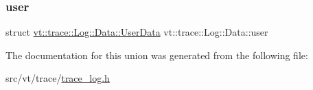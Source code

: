\subsubsection{\texorpdfstring{user}{user}}
{\footnotesize\ttfamily struct \hyperlink{structvt_1_1trace_1_1_log_1_1_data_1_1_user_data}{vt\+::trace\+::\+Log\+::\+Data\+::\+User\+Data}  vt\+::trace\+::\+Log\+::\+Data\+::user}



The documentation for this union was generated from the following file\+:\begin{DoxyCompactItemize}
\item 
src/vt/trace/\hyperlink{trace__log_8h}{trace\+\_\+log.\+h}\end{DoxyCompactItemize}

